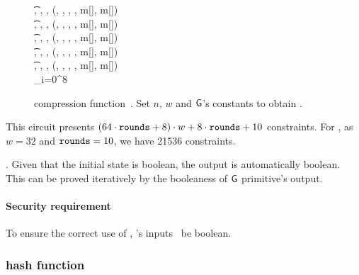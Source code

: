 \begin{figure*}[h!]
{    \t {}, , ,  \gets \blakeG(, , , , \hphantom{1} m[\tau[6]], \hphantom{1} m[\tau[7]]) \\
    \t {}, , ,  \gets \blakeG(, , , , \hphantom{1} m[\tau[8]], \hphantom{1} m[\tau[9]]) \\
    \t {}, , ,  \gets \blakeG(, , , , m[\tau[10]], m[\tau[11]]) \\
    \t {}, , \hphantom{1} ,  \gets \blakeG(, , \hphantom{1} , , m[\tau[12]], m[\tau[13]]) \\
    \t {}, , \hphantom{1} ,  \gets \blakeG(, , \hphantom{1} , , m[\tau[14]], m[\tau[15]]) \\
    \pcreturn \concat_{i=0}^8  \xor {} \xor {}
  }
  \caption{ compression function~\cite[Section 3.2]{blakecompietf}. Set $n$, $w$ and $\mathsf{G}$'s constants to obtain .}\label{implementation:alg:blake2s_comp}
\end{figure*}

This circuit presents $(64 \cdot \mathtt{rounds} + 8) \cdot w + 8 \cdot \mathtt{rounds} + 10$ constraints. For , as $w=32$ and $\mathtt{rounds}=10$, we have 21536 constraints.

. Given that the initial state is boolean, the output is automatically boolean. This can be proved iteratively by the booleaness of $\mathsf{G}$ primitive's output.

\paragraph*{Security requirement}

To ensure the correct use of , 's inputs \MUST~be boolean.

\subsubsection{ hash function}\label{implementation:efficiency:blake:hash-circuit}

